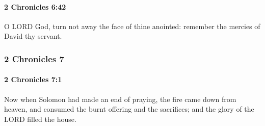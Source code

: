 		\paragraph{2 Chronicles 6:42} %
			\label{2CHRONICLES-6-42}

			O LORD God, turn not away the face of thine anointed: remember the mercies of David thy servant.

	\subsubsection{2 Chronicles 7} %
		\label{2CHRONICLES-7}

		\paragraph{2 Chronicles 7:1} %
			\label{2CHRONICLES-7-1}

			Now when Solomon had made an end of praying, the fire came down from heaven, and consumed the burnt offering and the sacrifices; and the glory of the LORD filled the house.

